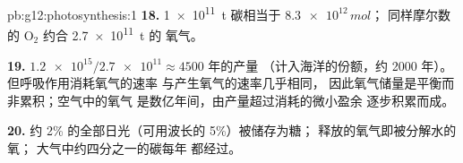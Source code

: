 \begin{solution}{pb:g12:photosynthesis:1}
\textbf{18.} \qty{1e11}{t} 碳相当于 $\num{8.3e12}\,\unit{mol}$；
同样摩尔数的 $\mathrm{O_2}$ 约合 \qty{2.7e11}{t} 的
氧气。

\textbf{19.} $\num{1.2e15}/\num{2.7e11} \approx 4500$ 年的产量
（计入海洋的份额，约 2000 年）。但呼吸作用消耗氧气的速率
与产生氧气的速率几乎相同，
因此氧气储量是平衡而非累积；空气中的氧气
是数亿年间，由产量超过消耗的微小盈余
逐步积累而成。

\textbf{20.} 约 2\% 的全部日光（可用波长的 5\%）被储存为糖；
释放的氧气即被分解水的氧；
大气中约四分之一的碳每年
都经过。
\end{solution}
